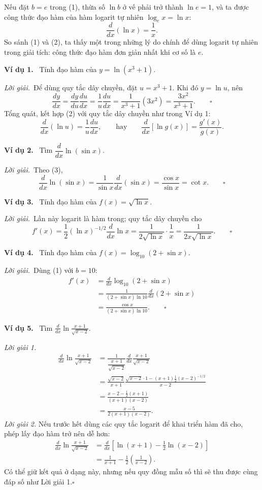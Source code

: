 \documentclass[12pt,a4paper]{article}
\newcommand{\ex}[1]{\par\medskip\noindent\textbf{Ví dụ #1.}\ }
\newcommand{\sol}{\par\nopagebreak[4]\noindent\textit{Lời giải.}\ }
\begin{document}
Nếu đặt $b=e$ trong (1), thừa số $\ln b$ ở vế phải trở thành $\ln e=1$, và ta được công thức đạo hàm của hàm logarit tự nhiên $\log_ex=\ln x$:
\[\frac{d}{dx}(\ln x)=\frac1x.\tag{2}\]
So sánh (1) và (2), ta thấy một trong những lý do chính để dùng logarit tự nhiên trong giải tích: công thức đạo hàm đơn giản nhất khi cơ số là $e$.
\ex{1} Tính đạo hàm của $y=\ln(x^3+1)$.
\sol Để dùng quy tắc dây chuyền, đặt $u=x^3+1$. Khi đó $y=\ln u$, nên
\[\frac{dy}{dx}=\frac{dy}{du}\frac{du}{dx}=\frac1u\frac{du}{dx}=\frac1{x^3+1}(3x^2)=\frac{3x^2}{x^3+1}.\qquad\square\]
Tổng quát, kết hợp (2) với quy tắc dây chuyền như trong Ví dụ 1:
\[\frac{d}{dx}(\ln u)=\frac1u\frac{du}{dx},\qquad\text{hay}\qquad
\frac{d}{dx}[\ln g(x)]=\frac{g'(x)}{g(x)}.\tag{3}\]
\ex{2} Tìm $\dfrac{d}{dx}\ln(\sin x)$.
\sol Theo (3),
\[\frac{d}{dx}\ln(\sin x)=\frac1{\sin x}\frac{d}{dx}(\sin x)=\frac{\cos x}{\sin x}=\cot x.\qquad\square\]
\ex{3} Tính đạo hàm của $f(x)=\sqrt{\ln x}$.
\sol Lần này logarit là hàm trong; quy tắc dây chuyền cho
\[f'(x)=\frac12(\ln x)^{-1/2}\frac{d}{dx}\ln x
=\frac1{2\sqrt{\ln x}}\cdot\frac1x=\frac1{2x\sqrt{\ln x}}.\qquad\square\]
\ex{4} Tính đạo hàm của $f(x)=\log_{10}(2+\sin x)$.
\sol Dùng (1) với $b=10$:
\begin{align*}
f'(x)&=\frac{d}{dx}\log_{10}(2+\sin x)\\
&=\frac1{(2+\sin x)\ln10}\frac{d}{dx}(2+\sin x)\\
&=\frac{\cos x}{(2+\sin x)\ln10}.\qquad\square
\end{align*}
\ex{5} Tìm $\displaystyle\frac{d}{dx}\ln\frac{x+1}{\sqrt{x-2}}$.

\noindent\textit{Lời giải 1.}
\begin{align*}
\frac{d}{dx}\ln\frac{x+1}{\sqrt{x-2}}
&=\frac1{\dfrac{x+1}{\sqrt{x-2}}}\frac{d}{dx}\frac{x+1}{\sqrt{x-2}}\\
&=\frac{\sqrt{x-2}}{x+1}
\frac{\sqrt{x-2}\cdot1-(x+1)\frac12(x-2)^{-1/2}}{x-2}\\
&=\frac{x-2-\frac12(x+1)}{(x+1)(x-2)}\\
&=\frac{x-5}{2(x+1)(x-2)}.
\end{align*}
\noindent\textit{Lời giải 2.} Nếu trước hết dùng các quy tắc logarit để khai triển hàm đã cho, phép lấy đạo hàm trở nên dễ hơn:
\begin{align*}
\frac{d}{dx}\ln\frac{x+1}{\sqrt{x-2}}
&=\frac{d}{dx}\left[\ln(x+1)-\frac12\ln(x-2)\right]\\
&=\frac1{x+1}-\frac12\left(\frac1{x-2}\right).
\end{align*}
Có thể giữ kết quả ở dạng này, nhưng nếu quy đồng mẫu số thì sẽ thu được cùng đáp số như Lời giải 1.\hfill$\square$
\end{document}
